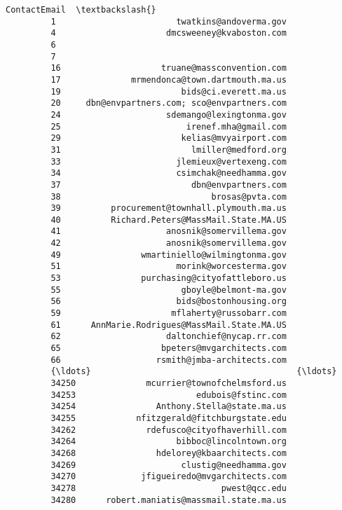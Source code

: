 \documentclass[11pt]{article}
\begin{document}
\begin{Verbatim}[commandchars=\\\{\}]
                                            ContactEmail  \textbackslash{}
         1                        twatkins@andoverma.gov   
         4                      dmcsweeney@kvaboston.com   
         6                                                 
         7                                                 
         16                    truane@massconvention.com   
         17              mrmendonca@town.dartmouth.ma.us   
         19                        bids@ci.everett.ma.us   
         20     dbn@envpartners.com; sco@envpartners.com   
         24                     sdemango@lexingtonma.gov   
         25                         irenef.mha@gmail.com   
         29                        kelias@mvyairport.com   
         31                          lmiller@medford.org   
         33                       jlemieux@vertexeng.com   
         34                       csimchak@needhamma.gov   
         37                          dbn@envpartners.com   
         38                              brosas@pvta.com   
         39          procurement@townhall.plymouth.ma.us   
         40          Richard.Peters@MassMail.State.MA.US   
         41                     anosnik@somervillema.gov   
         42                     anosnik@somervillema.gov   
         49                wmartiniello@wilmingtonma.gov   
         51                       morink@worcesterma.gov   
         53                purchasing@cityofattleboro.us   
         55                        gboyle@belmont-ma.gov   
         56                       bids@bostonhousing.org   
         59                      mflaherty@russobarr.com   
         61      AnnMarie.Rodrigues@MassMail.State.MA.US   
         62                     daltonchief@nycap.rr.com   
         65                    bpeters@mvgarchitects.com   
         66                   rsmith@jmba-architects.com   
         {\ldots}                                         {\ldots}   
         34250              mcurrier@townofchelmsford.us   
         34253                        edubois@fstinc.com   
         34254                Anthony.Stella@state.ma.us   
         34255            nfitzgerald@fitchburgstate.edu   
         34262              rdefusco@cityofhaverhill.com   
         34264                    bibboc@lincolntown.org   
         34268                hdelorey@kbaarchitects.com   
         34269                     clustig@needhamma.gov   
         34270             jfigueiredo@mvgarchitects.com   
         34278                             pwest@qcc.edu   
         34280      robert.maniatis@massmail.state.ma.us   

\end{Verbatim}
\end{document}

